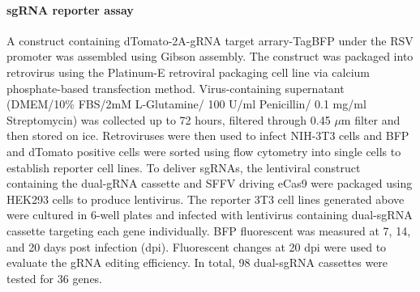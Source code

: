 \paragraph{sgRNA reporter assay}
A construct containing dTomato-2A-gRNA target arrary-TagBFP under the RSV promoter was assembled using Gibson assembly. The construct was packaged into retrovirus using the Platinum-E retroviral packaging cell line via calcium phosphate-based transfection method. Virus-containing supernatant (DMEM/10\% FBS/2mM L-Glutamine/ 100 U/ml Penicillin/ 0.1 mg/ml Streptomycin) was collected up to 72 hours, filtered through 0.45 $\mu$m filter and then stored on ice. Retroviruses were then used to infect NIH-3T3 cells and BFP and dTomato positive cells were sorted using flow cytometry into single cells to establish reporter cell lines. To deliver sgRNAs, the lentiviral construct containing the dual-gRNA cassette and SFFV driving eCas9 were packaged using HEK293 cells to produce lentivirus. The reporter 3T3 cell lines generated above were cultured in 6-well plates and infected with lentivirus containing dual-sgRNA cassette targeting each gene individually. BFP fluorescent was measured at 7, 14, and 20 days post infection (dpi). Fluorescent changes at 20 dpi were used to evaluate the gRNA editing efficiency. In total, 98 dual-sgRNA cassettes were tested for 36 genes.  

